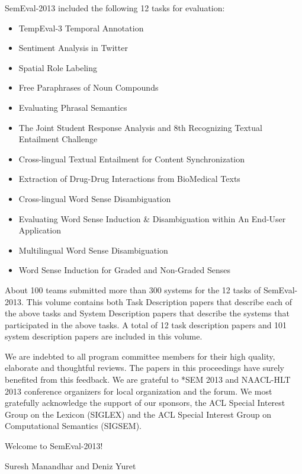 SemEval-2013 included the following 12 tasks for evaluation:

\begin{itemize}

\item TempEval-3 Temporal Annotation

\item Sentiment Analysis in Twitter

\item Spatial Role Labeling

\item Free Paraphrases of Noun Compounds

\item Evaluating Phrasal Semantics

\item The Joint Student Response Analysis and 8th Recognizing Textual Entailment Challenge

\item Cross-lingual Textual Entailment for Content Synchronization

\item Extraction of Drug-Drug Interactions from BioMedical Texts

\item Cross-lingual Word Sense Disambiguation

\item Evaluating Word Sense Induction \& Disambiguation within An End-User Application

\item Multilingual Word Sense Disambiguation

\item Word Sense Induction for Graded and Non-Graded Senses

\end{itemize}

About 100 teams submitted more than 300 systems for the 12 tasks of SemEval-2013.  This volume contains both Task Description papers that describe each of the above tasks and System Description papers that describe the systems that participated in the above tasks. A total of 12 task description papers and 101 system description papers are included in this volume.

We are indebted to all program committee members for their high quality, elaborate and thoughtful reviews. The papers in this proceedings have surely benefited from this feedback.  We are grateful to *SEM 2013 and NAACL-HLT 2013 conference organizers for local organization and the forum. We most gratefully acknowledge the support of our sponsors, the ACL Special Interest Group on the Lexicon (SIGLEX) and the ACL Special Interest Group on Computational Semantics (SIGSEM).

Welcome to SemEval-2013!

Suresh Manandhar and Deniz Yuret

\cleardoublepage

